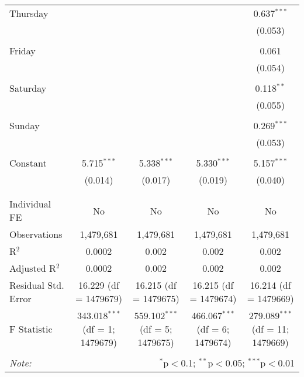 \documentclass[
]{article}
\begin{document}
\begin{table}[!htbp]
{\begin{tabular}{@{\extracolsep{5pt}}lcccc}
 Thursday &  &  &  & 0.637$^{***}$ \\ 
  &  &  &  & (0.053) \\ 
  & & & & \\ 
 Friday &  &  &  & 0.061 \\ 
  &  &  &  & (0.054) \\ 
  & & & & \\ 
 Saturday &  &  &  & 0.118$^{**}$ \\ 
  &  &  &  & (0.055) \\ 
  & & & & \\ 
 Sunday &  &  &  & 0.269$^{***}$ \\ 
  &  &  &  & (0.053) \\ 
  & & & & \\ 
 Constant & 5.715$^{***}$ & 5.338$^{***}$ & 5.330$^{***}$ & 5.157$^{***}$ \\ 
  & (0.014) & (0.017) & (0.019) & (0.040) \\ 
  & & & & \\ 
\hline \\[-1.8ex] 
Individual FE & No & No & No & No \\ 
Observations & 1,479,681 & 1,479,681 & 1,479,681 & 1,479,681 \\ 
R$^{2}$ & 0.0002 & 0.002 & 0.002 & 0.002 \\ 
Adjusted R$^{2}$ & 0.0002 & 0.002 & 0.002 & 0.002 \\ 
Residual Std. Error & 16.229 (df = 1479679) & 16.215 (df = 1479675) & 16.215 (df = 1479674) & 16.214 (df = 1479669) \\ 
F Statistic & 343.018$^{***}$ (df = 1; 1479679) & 559.102$^{***}$ (df = 5; 1479675) & 466.067$^{***}$ (df = 6; 1479674) & 279.089$^{***}$ (df = 11; 1479669) \\ 
\hline 
\hline \\[-1.8ex] 
\textit{Note:}  & \multicolumn{4}{r}{$^{*}$p$<$0.1; $^{**}$p$<$0.05; $^{***}$p$<$0.01} \\ 
\end{tabular}
} 
\end{table} 
\newpage
\end{document}

